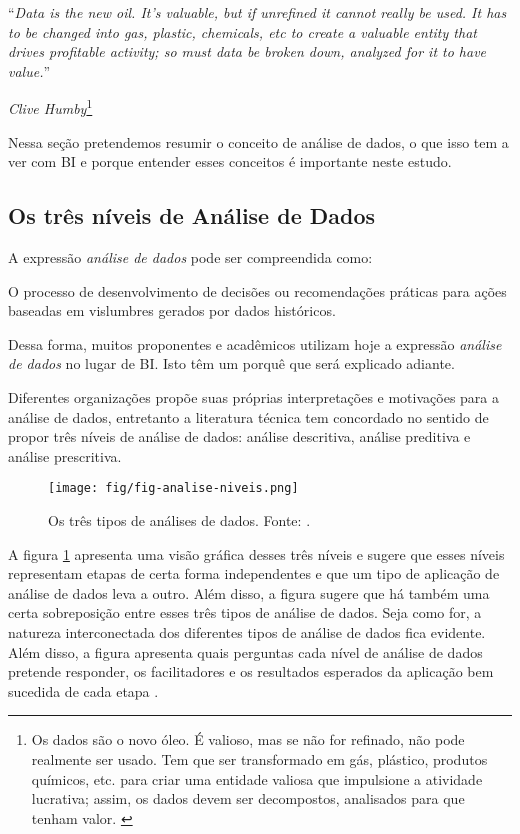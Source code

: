 \epigraph{``\emph{Data is the new oil. It’s valuable, but if unrefined it cannot really be used. It has to be changed into gas, plastic, chemicals, etc to create a valuable entity that drives profitable activity; so must data be broken down, analyzed for it to have value.}''}{\textit{Clive Humby}\footnote{Os dados são o novo óleo. É valioso, mas se não for refinado, não pode realmente ser usado. Tem que ser transformado em gás, plástico, produtos químicos, etc. para criar uma entidade valiosa que impulsione a atividade lucrativa; assim, os dados devem ser decompostos, analisados para que tenham valor. \cite[tradução livre]{epigrafes:dataisthenewoil}}}


    Nessa seção pretendemos resumir o conceito de análise de dados, o que isso tem a ver com BI e porque entender esses conceitos é importante neste estudo. 

\subsection{Os três níveis de Análise de Dados}
\label{sub-niveis}

    A expressão \emph{análise de dados} pode ser compreendida como:
    
    \begin{definition}
    O processo de desenvolvimento de decisões ou recomendações práticas para ações baseadas em vislumbres gerados por dados históricos. \cite[23]{turban2019} 
    \end{definition}
    
    Dessa forma, muitos proponentes e acadêmicos utilizam hoje a expressão \emph{análise de dados} no lugar de BI. Isto têm um porquê que será explicado adiante.
    
    Diferentes organizações propõe suas próprias interpretações e motivações para a análise de dados, entretanto a literatura técnica tem concordado no sentido de propor três níveis de análise de dados: análise descritiva, análise preditiva e análise prescritiva. 
    
        \begin{figure}[h]
            \centering
            \texttt{[image: fig/fig-analise-niveis.png]}
            \caption{Os três tipos de análises de dados. Fonte: \cite[adaptado]{turban2019}.}
            \label{fig:analise:niveis}
        \end{figure}
    
    
    A figura \ref{fig:analise:niveis} apresenta uma visão gráfica desses três níveis e sugere que esses níveis representam etapas de certa forma independentes e que um tipo de aplicação de análise de dados leva a outro. Além disso, a figura sugere que há também uma certa sobreposição entre esses três tipos de análise de dados. Seja como for, a natureza interconectada dos diferentes tipos de análise de dados fica evidente. Além disso, a figura apresenta quais perguntas cada nível de análise de dados pretende responder, os facilitadores e os resultados esperados da aplicação bem sucedida de cada etapa \cite[24]{turban2019}. 

